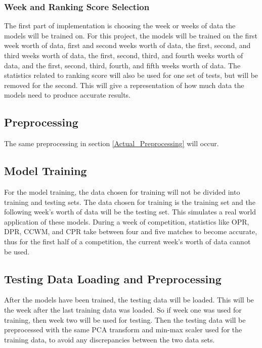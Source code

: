 \documentclass{article}
\begin{document}
\subsubsection{Week and Ranking Score Selection} \label{week_select}
\par
The first part of implementation is choosing the week or weeks of data the models will be trained on. For this project, the models will be trained on the first week worth of data, first and second weeks worth of data, the first, second, and third weeks worth of data, the first, second, third, and fourth weeks worth of data, and the first, second, third, fourth, and fifth weeks worth of data. The statistics related to ranking score will also be used for one set of tests, but will be removed for the second. This will give a representation of how much data the models need to produce accurate results.

\subsection{Preprocessing}
\par
The same preprocessing in section \ref{Actual_Preprocessing} will occur.

\subsection{Model Training}
\par
For the model training, the data chosen for training will not be divided into training and testing sets. The data chosen for training is the training set and the following week's worth of data will be the testing set. This simulates a real world application of these models. During a week of competition, statistics like OPR, DPR, CCWM, and CPR take between four and five matches to become accurate, thus for the first half of a competition, the current week's worth of data cannot be used.

\subsection{Testing Data Loading and Preprocessing}
\par
After the models have been trained, the testing data will be loaded. This will be the week after the last training data was loaded. So if week one was used for training, then week two will be used for testing. Then the testing data will be preprocessed with the same PCA transform and min-max scaler used for the training data, to avoid any discrepancies between the two data sets.
\end{document}
